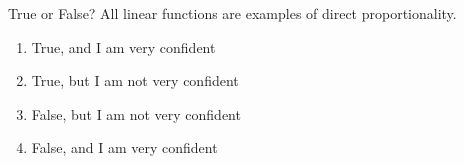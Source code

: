 \bigskip

\item True or False?  All linear functions are examples of direct proportionality.

\begin{enumerate}
\item True, and I am very confident  
\item True, but I am not very confident
\item False, but I am not very confident
\item False, and I am very confident  
\end{enumerate}

